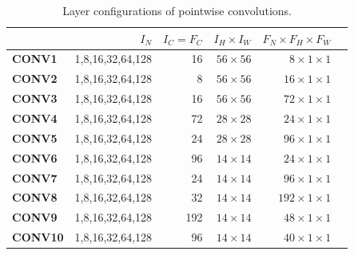 \begin{table}[]
\setlength{\tabcolsep}{4.2pt}
\caption{Layer configurations of pointwise convolutions.}
\vspace{-3mm}
\label{tab:pwconv}
\begin{threeparttable}
\begin{tabular}{lrrrrr}
\toprule
& \textbf{$I_N$} & \textbf{$I_C=F_C$} & \textbf{$I_H \times I_W$} & \textbf{$F_N \times F_H \times F_W$} \\
\midrule
\textbf{CONV1}  & 1,8,16,32,64,128  & 16    & $56\times 56$   & $8 \times 1\times 1$\\
\textbf{CONV2}  & 1,8,16,32,64,128  & 8     & $56\times 56$   & $16 \times 1\times 1$\\
\textbf{CONV3}  & 1,8,16,32,64,128  & 16    & $56\times 56$   & $72 \times 1\times 1$\\
\textbf{CONV4}  & 1,8,16,32,64,128  & 72    & $28\times 28$   & $24 \times 1\times 1$\\
\textbf{CONV5}  & 1,8,16,32,64,128  & 24    & $28\times 28$   & $96 \times 1\times 1$\\
\textbf{CONV6}  & 1,8,16,32,64,128  & 96    & $14\times 14$   & $24 \times 1\times 1$\\
\textbf{CONV7} & 1,8,16,32,64,128  & 24    & $14\times 14$   & $96  \times 1\times 1$\\
\textbf{CONV8} & 1,8,16,32,64,128  & 32    & $14\times 14$   & $192 \times 1\times 1$\\
\textbf{CONV9} & 1,8,16,32,64,128  & 192   & $14\times 14$   & $48  \times 1\times 1$\\
\textbf{CONV10} & 1,8,16,32,64,128  & 96    & $14\times 14$   & $40 \times 1\times 1$\\

\end{tabular}
\end{threeparttable}
\end{table}
